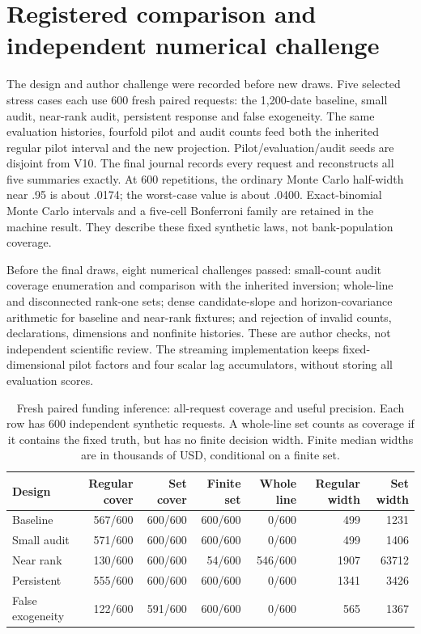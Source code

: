 \section{Registered comparison and independent numerical challenge}

The design and author challenge were recorded before new draws. Five selected
stress cases each use 600 fresh paired requests: the 1,200-date baseline,
small audit, near-rank audit, persistent response and false exogeneity. The
same evaluation histories, fourfold pilot and audit counts feed both the
inherited regular pilot interval and the new projection. Pilot/evaluation/audit
seeds are disjoint from V10. The final journal records every request and
reconstructs all five summaries exactly. At 600 repetitions, the ordinary
Monte Carlo half-width near .95 is about .0174; the worst-case value is about
.0400. Exact-binomial Monte Carlo intervals and a five-cell Bonferroni family
are retained in the machine result. They describe these fixed synthetic laws,
not bank-population coverage.

Before the final draws, eight numerical challenges passed: small-count audit
coverage enumeration and comparison with the inherited inversion; whole-line
and disconnected rank-one sets; dense candidate-slope and horizon-covariance
arithmetic for baseline and near-rank fixtures; and rejection of invalid
counts, declarations, dimensions and nonfinite histories. These are author
checks, not independent scientific review. The streaming implementation keeps
fixed-dimensional pilot factors and four scalar lag accumulators, without
storing all evaluation scores.

\begin{table}[htbp]
\centering\small
\caption{Fresh paired funding inference: all-request coverage and useful precision. Each row has 600 independent synthetic requests. A whole-line set counts as coverage if it contains the fixed truth, but has no finite decision width. Finite median widths are in thousands of USD, conditional on a finite set.}
\label{integrated:weak_audit_projection:tab:weak-audit-results}
\begin{tabular}{lrrrrrr}
\toprule
Design & Regular cover & Set cover & Finite set & Whole line & Regular width & Set width \\
\midrule
Baseline & 567/600 & 600/600 & 600/600 & 0/600 & 499 & 1231 \\
Small audit & 571/600 & 600/600 & 600/600 & 0/600 & 499 & 1406 \\
Near rank & 130/600 & 600/600 & 54/600 & 546/600 & 1907 & 63712 \\
Persistent & 555/600 & 600/600 & 600/600 & 0/600 & 1341 & 3426 \\
False exogeneity & 122/600 & 591/600 & 600/600 & 0/600 & 565 & 1367 \\
\bottomrule
\end{tabular}
\end{table}


